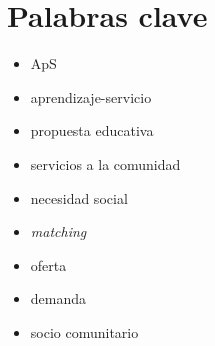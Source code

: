 \documentclass[11pt]{book}
\begin{document}
	\chapter*{Palabras clave} 
	\begin{itemize} 
		\item ApS
		\item aprendizaje-servicio
		\item propuesta educativa
		\item servicios a la comunidad
		\item necesidad social
		\item \textit{matching}
		\item oferta
		\item demanda
		\item socio comunitario
	\end{itemize}
	
\end{document}
